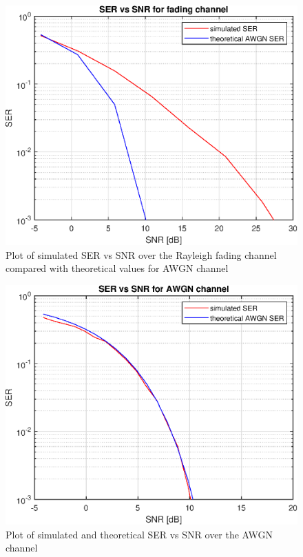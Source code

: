 \documentclass[conference]{IEEEtran}
\begin{document}
\begin{figure}[H]
    \centering
    \includegraphics[width=\linewidth]{images/SERvsSNR_fading.eps}
    \caption{Plot of simulated SER vs SNR over the Rayleigh fading channel compared with theoretical values for AWGN channel}
    \label{SERfading}
\end{figure}

\begin{figure}[H]
    \centering
    \includegraphics[width=\linewidth]{images/SERvsSNR_awgn.eps}
    \caption{Plot of simulated and theoretical SER vs SNR over the AWGN channel}
    \label{SERawgn}
\end{figure}
\end{document}
